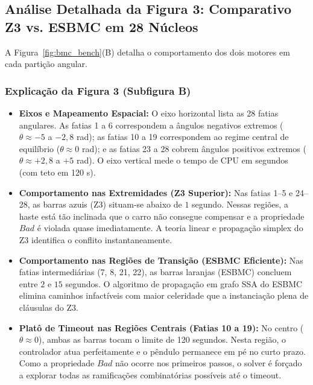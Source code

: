 \documentclass[11pt,a4paper]{article}
\theoremstyle{definition}
\begin{document}
\subsection{Análise Detalhada da Figura 3: Comparativo Z3 vs. ESBMC em 28 Núcleos}

A Figura~\ref{fig:bmc_bench}(B) detalha o comportamento dos dois motores em cada partição angular.

\subsubsection{Explicação da Figura 3 (Subfigura B)}
\begin{itemize}
    \item \textbf{Eixos e Mapeamento Espacial:} O eixo horizontal lista as 28 fatias angulares. As fatias 1 a 6 correspondem a ângulos negativos extremos ($\theta \approx -5$ a $-2{,}8$ rad); as fatias 10 a 19 correspondem ao regime central de equilíbrio ($\theta \approx 0$ rad); e as fatias 23 a 28 cobrem ângulos positivos extremos ($\theta \approx +2{,}8$ a $+5$ rad). O eixo vertical mede o tempo de CPU em segundos (com teto em 120 s).
    \item \textbf{Comportamento nas Extremidades (Z3 Superior):} Nas fatias 1--5 e 24--28, as barras azuis (Z3) situam-se abaixo de $1$ segundo. Nessas regiões, a haste está tão inclinada que o carro não consegue compensar e a propriedade $Bad$ é violada quase imediatamente. A teoria linear e propagação simplex do Z3 identifica o conflito instantaneamente.
    \item \textbf{Comportamento nas Regiões de Transição (ESBMC Eficiente):} Nas fatias intermediárias (7, 8, 21, 22), as barras laranjas (ESBMC) concluem entre $2$ e $15$ segundos. O algoritmo de propagação em grafo SSA do ESBMC elimina caminhos infactíveis com maior celeridade que a instanciação plena de cláusulas do Z3.
    \item \textbf{Platô de Timeout nas Regiões Centrais (Fatias 10 a 19):} No centro ($\theta \approx 0$), ambas as barras tocam o limite de 120 segundos. Nesta região, o controlador atua perfeitamente e o pêndulo permanece em pé no curto prazo. Como a propriedade $Bad$ não ocorre nos primeiros passos, o solver é forçado a explorar todas as ramificações combinatórias possíveis até o timeout.
\end{itemize}
\end{document}
